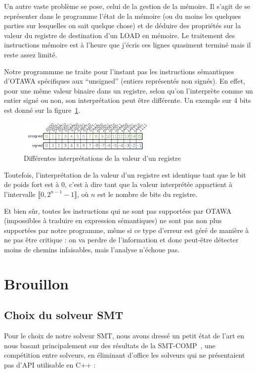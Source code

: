 \documentclass[french]{article}
\begin{document}
  Un autre vaste problème se pose, celui de la gestion de la mémoire. Il s'agit de se représenter dans le programme l'état de la mémoire (ou du moins les quelques parties sur lesquelles on sait quelque chose) et de déduire des propriétés sur la valeur du registre de destination d'un LOAD en mémoire. Le traitement des instructions mémoire est à l'heure que j'écris ces lignes quasiment terminé mais il reste assez limité.

  Notre programmme ne traite pour l'instant pas les instructions sémantiques d'OTAWA spécifiques aux ``unsigned'' (entiers représentés non signés). En effet, pour une même valeur binaire dans un registre, selon qu'on l'interprète comme un entier signé ou non, son interprétation peut être différente. Un exemple sur 4 bits est donné sur la figure~\ref{representation_signed_unsigned}.

  \begin{figure}
    \centering
    \includegraphics[width=250px]{pictures/representation_signed_unsigned.png}
    \caption{Différentes interprétations de la valeur d'un registre}
    \label{representation_signed_unsigned}
  \end{figure}

  Toutefois, l'interprétation de la valeur d'un registre est identique tant que le bit de poids fort est à 0, c'est à dire tant que la valeur interprétée appartient à l'intervalle $\llbracket0, 2^{n-1}-1\rrbracket$, où $n$ est le nombre de bits du registre.

  Et bien sûr, toutes les instructions qui ne sont pas supportées par OTAWA (impossibles à traduire en expression sémantiques) ne sont pas non plus supportées par notre programme, même si ce type d'erreur est géré de manière à ne pas être critique : on va perdre de l'information et donc peut-être détecter moins de chemins infaisables, mais l'analyse n'échoue pas.

  \section{Brouillon}
  \subsection{Choix du solveur SMT}
  Pour le choix de notre solveur SMT, nous avons dressé un petit état de l'art en nous basant principalement sur des résultats de la SMT-COMP~\cite{SMT-COMP}, une compétition entre solveurs, en éliminant d'office les solveurs qui ne présentaient pas d'API utilisable en C++ :
\end{document}
